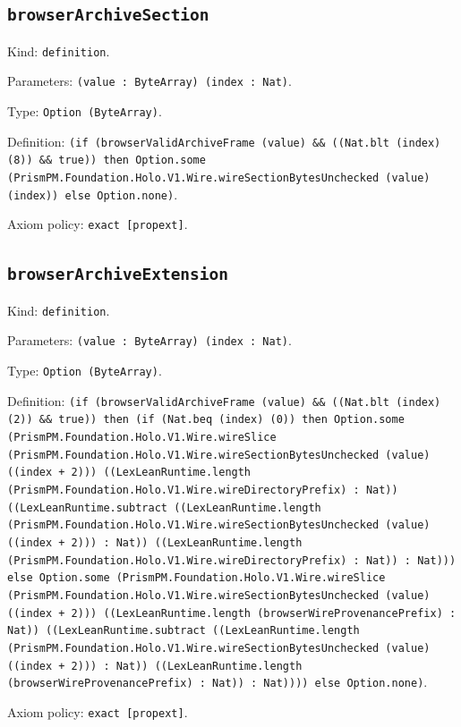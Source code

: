 \documentclass[11pt]{article}
\begin{document}
\subsection*{\texttt{browserArchiveSection}}
\noindent Kind: \texttt{definition}.\par
\noindent Parameters: \texttt{(value : ByteArray) (index : Nat)}.\par
\noindent Type: \texttt{Option (ByteArray)}.\par
\noindent Definition: \texttt{(if (browserValidArchiveFrame (value) \&\& ((Nat.blt (index) (8)) \&\& true)) then Option.some (PrismPM.Foundation.Holo.V1.Wire.wireSectionBytesUnchecked (value) (index)) else Option.none)}.\par
\noindent Axiom policy: \texttt{exact [propext]}.\par
\subsection*{\texttt{browserArchiveExtension}}
\noindent Kind: \texttt{definition}.\par
\noindent Parameters: \texttt{(value : ByteArray) (index : Nat)}.\par
\noindent Type: \texttt{Option (ByteArray)}.\par
\noindent Definition: \texttt{(if (browserValidArchiveFrame (value) \&\& ((Nat.blt (index) (2)) \&\& true)) then (if (Nat.beq (index) (0)) then Option.some (PrismPM.Foundation.Holo.V1.Wire.wireSlice (PrismPM.Foundation.Holo.V1.Wire.wireSectionBytesUnchecked (value) ((index + 2))) ((LexLeanRuntime.length (PrismPM.Foundation.Holo.V1.Wire.wireDirectoryPrefix) : Nat)) ((LexLeanRuntime.subtract ((LexLeanRuntime.length (PrismPM.Foundation.Holo.V1.Wire.wireSectionBytesUnchecked (value) ((index + 2))) : Nat)) ((LexLeanRuntime.length (PrismPM.Foundation.Holo.V1.Wire.wireDirectoryPrefix) : Nat)) : Nat))) else Option.some (PrismPM.Foundation.Holo.V1.Wire.wireSlice (PrismPM.Foundation.Holo.V1.Wire.wireSectionBytesUnchecked (value) ((index + 2))) ((LexLeanRuntime.length (browserWireProvenancePrefix) : Nat)) ((LexLeanRuntime.subtract ((LexLeanRuntime.length (PrismPM.Foundation.Holo.V1.Wire.wireSectionBytesUnchecked (value) ((index + 2))) : Nat)) ((LexLeanRuntime.length (browserWireProvenancePrefix) : Nat)) : Nat)))) else Option.none)}.\par
\noindent Axiom policy: \texttt{exact [propext]}.\par
\end{document}
